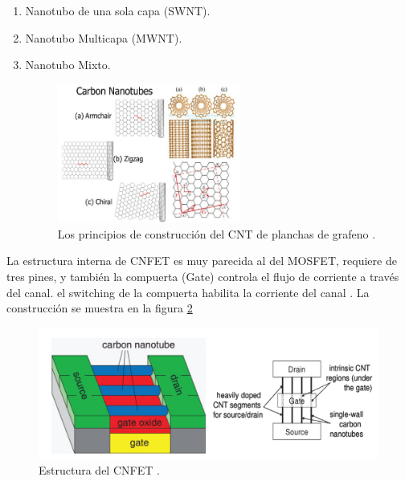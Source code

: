 \documentclass[conference]{IEEEtran} %
\begin{document}
	\begin{enumerate}
		\item Nanotubo de una sola capa (SWNT).\\
		\item Nanotubo Multicapa (MWNT). \\
		\item Nanotubo Mixto.
		
		\begin{figure}[h!]
			\centering
			\includegraphics[width=6cm]{IMAGENES/img12}
			\caption{Los principios de construcción del CNT de planchas de grafeno \cite{PerformanceAnalysisofClassical2018} .}
			\label{img12}
		\end{figure}
		
	\end{enumerate}





	La estructura interna de CNFET es muy parecida al del MOSFET, requiere de tres pines, y también la compuerta (Gate) controla el flujo de corriente a través del canal. el switching de la compuerta habilita  la corriente del canal \cite{PerformanceAnalysisofClassical2018}. La construcción se muestra en la figura \ref{img13}
	
	\begin{figure}[h!]
		\centering
		\includegraphics[width=12cm]{IMAGENES/img13}
		\caption{Estructura del CNFET \cite{Performanceinvestigationofemerging2016}.}
		\label{img13}
	\end{figure}
\end{document}
